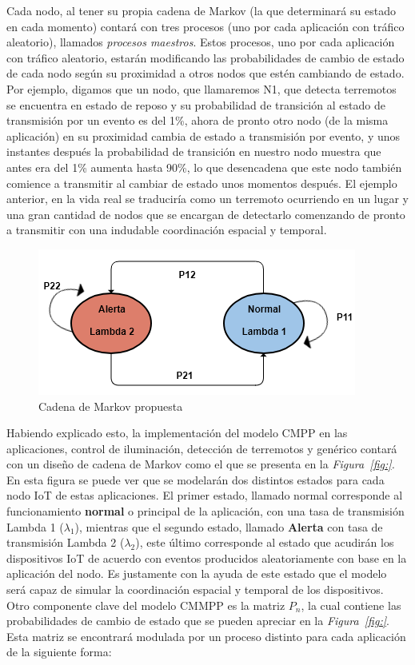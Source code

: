 Cada nodo, al tener su propia cadena de Markov (la que determinará su estado en cada momento) contará con tres procesos (uno por cada aplicación con tráfico aleatorio), llamados \textit{procesos maestros}. Estos procesos, uno por cada aplicación con tráfico aleatorio, estarán modificando las probabilidades de cambio de estado de cada nodo según su proximidad a otros nodos que estén cambiando de estado. Por ejemplo, digamos que un nodo, que llamaremos N1, que detecta terremotos se encuentra en estado de reposo y su probabilidad de transición al estado de transmisión por un evento es del 1\%, ahora de pronto otro nodo (de la misma aplicación) en su proximidad cambia de estado a transmisión por evento, y unos instantes después la probabilidad de transición en nuestro nodo muestra que antes era del 1\% aumenta hasta 90\%, lo que desencadena que este nodo también comience a transmitir al cambiar de estado unos momentos después. El ejemplo anterior, en la vida real se traduciría como un terremoto ocurriendo en un lugar y una gran cantidad de nodos que se encargan de detectarlo comenzando de pronto a transmitir con una indudable coordinación espacial y temporal.

\begin{figure}[th]
\centering
\includegraphics[scale=1]{Figures/Cadena de Markov propuesta}
\decoRule
\caption[Cadena de Markov propuesta]{Cadena de Markov propuesta}
\label{fig:CMMPPpropuesta}
\end{figure}

Habiendo explicado esto, la implementación del modelo CMPP en las aplicaciones, control de iluminación, detección de terremotos y genérico contará con un diseño de cadena de Markov como el que se presenta en la \textit{Figura~\ref{fig:}. }En esta figura se puede ver que se modelarán dos distintos estados para cada nodo IoT de estas aplicaciones. El primer estado, llamado normal corresponde al funcionamiento \textbf{normal} o principal de la aplicación, con una tasa de transmisión Lambda 1 (${\lambda }_1$), mientras que el segundo estado, llamado \textbf{Alerta} con tasa de transmisión Lambda 2 (${\lambda }_2$), este último corresponde al estado que acudirán los dispositivos IoT de acuerdo con eventos producidos aleatoriamente con base en la aplicación del nodo. Es justamente con la ayuda de este estado que el modelo será capaz de simular la coordinación espacial y temporal de los dispositivos. Otro componente clave del modelo CMMPP es la matriz $P_n$, la cual contiene las probabilidades de cambio de estado que se pueden apreciar en la \textit{Figura~\ref{fig:}}. Esta matriz se encontrará modulada por un proceso distinto para cada aplicación de la siguiente forma:

